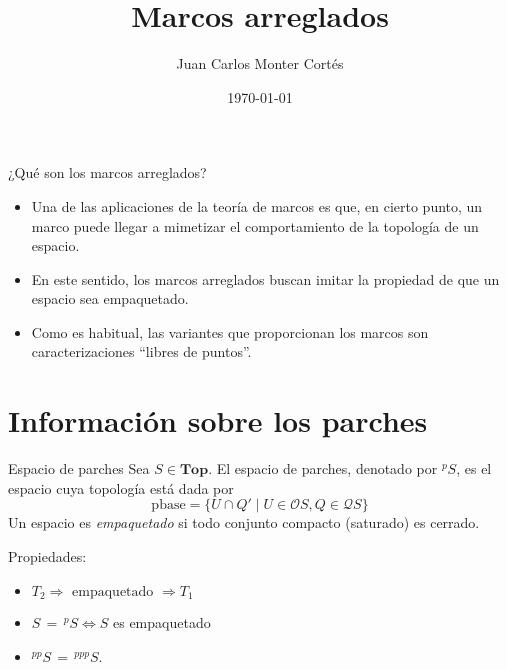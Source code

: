 \documentclass[compress,12pt]{beamer}
\title{Marcos arreglados}
\date{\today}
\author{Juan Carlos Monter Cortés}
\institute{Universidad de Guadalajara}
\begin{document}
\frame[plain]{\titlepage}


\begin{frame}{¿Qué son los marcos arreglados?}
    \begin{itemize}

    \item Una de las aplicaciones de la teoría de marcos es que, en cierto punto, un marco puede llegar a mimetizar el comportamiento de la topología de un espacio.\\

    \item En este sentido, los marcos arreglados buscan imitar la propiedad de que un espacio sea empaquetado.\\

    \item Como es habitual, las variantes que proporcionan los marcos son caracterizaciones ``libres de puntos''.
    \end{itemize}
\end{frame}

\section{Información sobre los parches}
\begin{frame}{Espacio de parches}
    Sea $S\in \mathbf{Top}$. El espacio de parches, denotado por $^pS$, es el espacio cuya topología está dada por 
\[
\mbox{pbase}=\{U\cap Q'\mid U\in \mathcal{O}S, Q\in \mathcal{Q}S\}
\]
Un espacio es \emph{empaquetado} si todo conjunto compacto (saturado) es cerrado.
\begin{block}{Propiedades:}
    \begin{itemize}
        \item $T_2\Rightarrow \mbox{ empaquetado }\Rightarrow T_1$
        \item $S\,=\,^pS\Leftrightarrow S$ es empaquetado
        \item $^{pp}S\,=\,^{ppp}S$.
    \end{itemize}
\end{block}
\end{frame}
\end{document}
